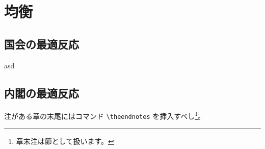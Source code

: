 \documentclass[main.tex]{subfiles}
\begin{document}
\section{均衡}


\subsection{国会の最適反応}

asd

\subsection{内閣の最適反応}



\theendnotes %

注がある章の末尾にはコマンド \verb#\theendnotes# を挿入すべし\footnote{章末注は節として扱います。}。


\theendnotes %
\end{document}
